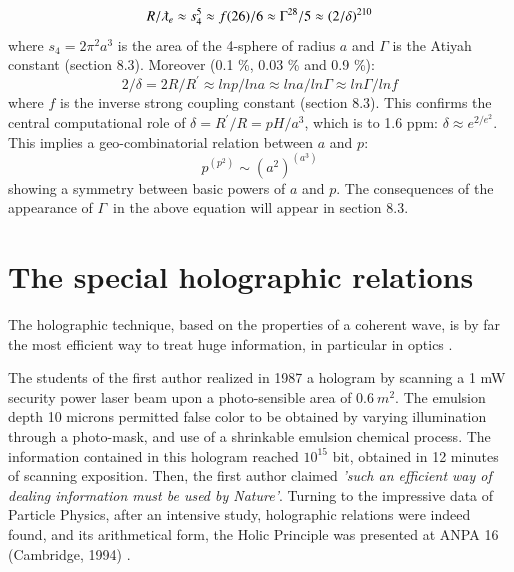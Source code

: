 \documentclass[twoside,draft]{article}
\begin{document}
\begin{sloppypar}
\begin{equation}
R/\lambdabar_{e} \approx s_4^5 \approx f(26)/6 \approx \Gamma^{28}/5 \approx (2/\delta)^{210}
\end{equation}
where $s_4 = 2\pi^2 a^3$ is the area of the 4-sphere of radius $a$ and $\Gamma$ is the Atiyah constant (section 8.3). Moreover (0.1 \%, 0.03 \% and 0.9 \%):
\begin{equation}
2/\delta = 2R/R^{\prime} \approx lnp/lna \approx lna/ln\Gamma \approx ln\Gamma/lnf
\end{equation}
where $f$ is the inverse strong coupling constant (section 8.3). This  confirms the central computational role of $\delta = R^{\prime}/R = pH/a^{3}$, which is to 1.6 ppm: $\delta \approx e^{2/e^2}$. This implies a geo-combinatorial relation between $a$ and $p$:
\begin{equation}
 p^{(p^{2})} \sim (a^{2})^{(a^{3})}   
\end{equation}
showing a symmetry between basic powers of $a$ and $p$. The consequences of the appearance of $\Gamma$\ in the above equation will appear in section 8.3. 

\section{The special holographic relations}

The holographic technique, based on the properties of a coherent wave, is by far the most efficient way to treat huge information, in particular in optics \cite{Grosmann}.

The students of the first author realized in 1987 a hologram by scanning a 1 mW security power laser beam upon a photo-sensible area of $0.6~ m^2$. The emulsion depth 10 microns permitted false color to be obtained by varying illumination through a photo-mask, and use of a shrinkable emulsion chemical process. The information contained in this hologram reached $10^{15}$ bit, obtained in 12 minutes of scanning exposition. Then, the first author claimed \textit{'such an efficient way of dealing information must be used by Nature'}. Turning to the impressive data of Particle Physics, after an intensive study, holographic relations were indeed found, and its arithmetical form, the Holic Principle was presented at ANPA 16 (Cambridge, 1994) \cite{Sanchez4}. 


\end{sloppypar}
\end{document}
